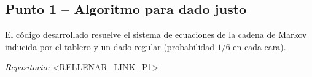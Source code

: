 \subsection{Punto 1 – Algoritmo para dado justo}
 El código desarrollado resuelve el sistema de ecuaciones de la cadena de
 Markov inducida por el tablero y un dado regular (probabilidad $1/6$ en
 cada cara).
 
\vspace{0.3em}
\noindent\emph{Repositorio:} \url{<RELLENAR_LINK_P1>}